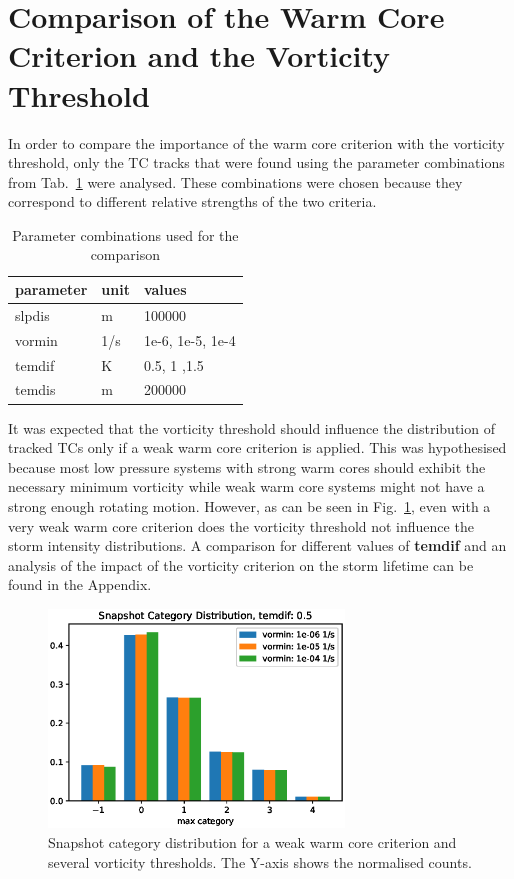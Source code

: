 \section{Comparison of the Warm Core Criterion and the Vorticity Threshold}\label{sec:warmcore-var}
In order to compare the importance of the warm core criterion with the vorticity threshold, only the TC tracks that were found using the parameter combinations from Tab.~\ref{tab:vor-tem-comparison} were analysed. These combinations were chosen because they correspond to different relative strengths of the two criteria.

\begin{table}[ht]
	\centering
	\begin{tabular}{|l|l|l|}
		\hline
		\textbf{parameter} & \textbf{unit} & \textbf{values}  \\ \hline
		slpdis             & m             & 100000           \\
		vormin             & 1/s           & 1e-6, 1e-5, 1e-4 \\
		temdif             & K             & 0.5, 1 ,1.5      \\
		temdis             & m             & 200000           \\ \hline
	\end{tabular}
	\caption{Parameter combinations used for the comparison}
	\label{tab:vor-tem-comparison}
\end{table}

It was expected that the vorticity threshold should influence the distribution of tracked TCs only if a weak warm core criterion is applied. This was hypothesised because most low pressure systems with strong warm cores should exhibit the necessary minimum vorticity while weak warm core systems might not have a strong enough rotating motion. However, as can be seen in Fig.~\ref{fig:temdif-vormin-comp}, even with a very weak warm core criterion does the vorticity threshold not influence the storm intensity distributions. A comparison for different values of \textbf{temdif} and an analysis of the impact of the vorticity criterion on the storm lifetime can be found in the Appendix.
\begin{figure}[ht]
	\centering
	\includegraphics[width=0.7\textwidth]{img/curr_category_vortem05.eps}
	\caption{Snapshot category distribution for a weak warm core criterion and several vorticity thresholds. The Y-axis shows the normalised counts.}
	\label{fig:temdif-vormin-comp}
\end{figure}


